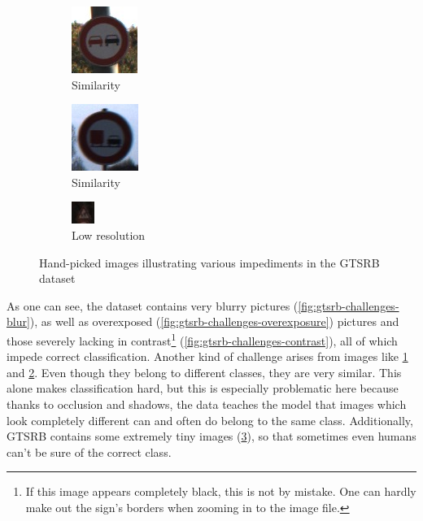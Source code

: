 \documentclass[11pt, a4paper]{article}
\begin{document}
\begin{figure}[htb]
    \begin{subfigure}[b]{0.30\textwidth}
    		\centering
        \includegraphics{gtsrb/problems/class09_00004_00029.jpg}
        \caption{Similarity}
        \label{fig:gtsrb-challenges-similar-a}
    \end{subfigure}
    \begin{subfigure}[b]{0.30\textwidth}
    		\centering
        \includegraphics{gtsrb/problems/class10_00025_00029.jpg}
        \caption{Similarity}
        \label{fig:gtsrb-challenges-similar-b}
    \end{subfigure}
    \begin{subfigure}[b]{0.30\textwidth}
    		\centering
        \includegraphics{gtsrb/problems/class28_00012_00003.jpg}
        \caption{Low resolution}
        \label{fig:gtsrb-challenges-resolution}
    \end{subfigure}
    \caption{Hand-picked images illustrating various impediments in the GTSRB dataset}
    \label{fig:gtsrb-challenges}
\end{figure}

As one can see, the dataset contains very blurry pictures (\ref{fig:gtsrb-challenges-blur}), as well as overexposed (\ref{fig:gtsrb-challenges-overexposure}) pictures and those severely lacking in contrast\footnote{If this image appears completely black, this is not by mistake. One can hardly make out the sign's borders when zooming in to the image file.} (\ref{fig:gtsrb-challenges-contrast}), all of which impede correct classification. Another kind of challenge arises from images like \ref{fig:gtsrb-challenges-similar-a} and \ref{fig:gtsrb-challenges-similar-b}. Even though they belong to different classes, they are very similar. This alone makes classification hard, but this is especially problematic here because thanks to occlusion and shadows, the data teaches the model that images which look completely different can and often do belong to the same class. Additionally, GTSRB contains some extremely tiny images (\ref{fig:gtsrb-challenges-resolution}), so that sometimes even humans can't be sure of the correct class.
\end{document}
